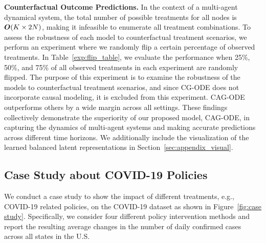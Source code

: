 \textbf{Counterfactual Outcome Predictions.} In the context of a multi-agent dynamical system, the total number of possible treatments for all nodes is $\bm{O}(K \times 2N)$, making it infeasible to enumerate all treatment combinations. To assess the robustness of each model to counterfactual treatment scenarios, we perform an experiment where we randomly flip a certain percentage of observed treatments. In Table~\ref{exp:flip_table}, we evaluate the performance when 25\%, 50\%, and 75\% of all observed treatments in each experiment are randomly flipped.
The purpose of this experiment is to examine the robustness of the models to counterfactual treatment scenarios, and since CG-ODE does not incorporate causal modeling, it is excluded from this experiment.
CAG-ODE outperforms others by a wide margin across all settings.
These findings collectively demonstrate the superiority of our proposed model, CAG-ODE, in capturing the dynamics of multi-agent systems and making accurate predictions across different time horizons. We additionally include the visualization of the learned balanced latent representations in Section~\ref{sec:appendix_visual}.






\subsection{Case Study about COVID-19 Policies} 






We conduct a case study to show the impact of different treatments, e.g., COVID-19 related policies, on the COVID-19 dataset as shown in Figure~\ref{fig:case study}. Specifically, we consider four different policy intervention methods and report the resulting average changes in the number of daily confirmed cases across all states in the U.S.



